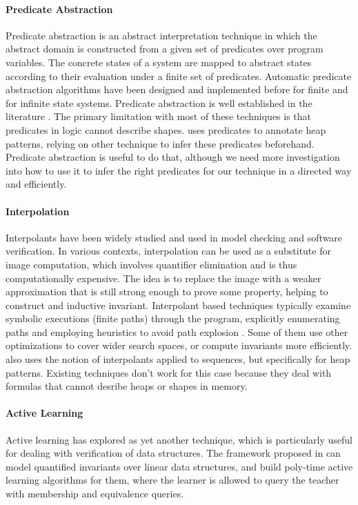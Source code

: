 \paragraph{Predicate Abstraction}
Predicate abstraction is an abstract interpretation technique in which the abstract domain is constructed from a given set of predicates over program variables. The concrete states of a system are mapped to abstract states according to their evaluation under a finite set of predicates. Automatic predicate abstraction algorithms have been designed and implemented before for finite and for infinite state systems. Predicate abstraction is well established in the literature \cite{ball01,henzinger02,henzinger04}. The primary limitation with most of these techniques is that predicates in logic cannot describe shapes.
\verifier uses predicates to annotate heap patterns, relying on other technique to infer these predicates beforehand. Predicate abstraction is useful to do that, although we need more investigation into how to use it to infer the right predicates for our technique in a directed way and efficiently.

\paragraph{Interpolation}
Interpolants have been widely studied and used in model checking and software verification. In various contexts, interpolation can be used as a substitute for image computation, which involves quantifier elimination and is thus computationally expensive. The idea is to replace the image with a weaker approximation that is still strong enough to prove some property, helping to construct and inductive invariant. Interpolant based techniques typically examine symbolic executions (finite paths) through the program, explicitly enumerating paths and employing heuristics to avoid path explosion \cite{albarghouthi12,heizmann10,mcmillan06,rummer13}. Some of them use other optimizations to cover wider search spaces, or compute invariants more efficiently. \verifier also uses the notion of interpolants applied to sequences, but specifically for heap patterns. Existing techniques don't work for this case because they deal with formulas that cannot desribe heaps or shapes in memory.

\paragraph{Active Learning}
Active learning has explored as yet another technique, which is particularly useful for dealing with verification of data structures. The framework proposed in \cite{garg13} can model quantified invariants over linear data structures, and build poly-time active learning algorithms for them, where the learner is allowed to query the teacher with membership and equivalence queries.

